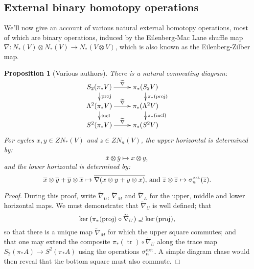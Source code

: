 \documentclass[11pt]{amsart}
\theoremstyle{plain}
\newtheorem{prop}[thm]{Proposition}
\theoremstyle{definition}
\renewcommand{\ker}{\textup{ker}\,}
\DeclareMathOperator{\trace}{tr}
\renewcommand{\to}{\longrightarrow}
\newcommand{\calV}{\mathcal{V}}
\theoremstyle{plain}
\newcommand{\vect}[2]{\calV^{#1}_{#2}}
\begin{document}
\begin{Constructing (co)homotopy operations}
\subsection{External binary homotopy operations}
We'll now give an account of various natural external homotopy operations, most of which are binary operations, induced by the  Eilenberg-Mac Lane shuffle map $\nabla:N_*(V)\otimes N_*(V)\to N_*(V\otimes V)$, which is also known as the Eilenberg-Zilber map.
\begin{prop}[Various authors]\label{the top external homotopy operations}
There is a natural commuting diagram:
\[\xymatrix@R=4mm{
S_2(\pi_*V)\ar[r]^-{\smash{\widetilde{\nabla}}}
\ar[d]^-{\textup{proj}}
&%
\pi_*(S_2V)\ar[d]^-{\pi_*(\textup{proj})}
\\%
\Lambda^2(\pi_*V)\ar[r]^-{\widetilde{\nabla}}
\ar[d]^-{\textup{incl}}
&%
\pi_*(\Lambda^2V)\ar[d]^-{\pi_*(\textup{incl})}
\\%
S^2(\pi_*V)\ar[r]^-{\widetilde{\nabla}}&%
\pi_*(S^2V)%
}\]
For cycles $x,y\in ZN_*(V)$ and $z\in ZN_n(V)$, the upper horizontal is determined by:
\[\overline{x}\otimes\overline{y}\mapsto \overline{x\otimes y},\]
and the lower horizontal is determined by:
\[\overline{x}\otimes\overline{y}+\overline{y}\otimes \overline{x}\mapsto\overline{\nabla(x\otimes y+y\otimes x)}\textup{, and }\overline{z}\otimes\overline{z}\mapsto\sigma^\textup{ext}_n(\overline{z}).\]
\end{prop}
\begin{proof}
During this proof, write $\widetilde{\nabla}_U$, $\widetilde{\nabla}_M$ and $\widetilde{\nabla}_L$ for the upper, middle and lower horizontal maps. We must demonstrate: that $\widetilde{\nabla}_U$  is well defined; that
\[\ker(\pi_*(\textup{proj})\circ\widetilde{\nabla}_U)\supseteq\ker(\textup{proj}),\]
so that there is a unique map $\widetilde{\nabla}_M$ for which the upper square commutes; and that one may extend the composite $\pi_*(\trace)\circ\widetilde{\nabla}_U$ along the trace map $S_2(\pi_*A)\to S^2(\pi_*A)$ using the operations
$\sigma_n^\textup{ext}$.
A simple diagram chase would then reveal that the bottom square must also commute.


\end{proof}
\end{Constructing (co)homotopy operations}
\end{document}
